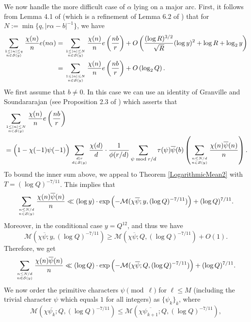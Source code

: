 \documentclass[12pt]{amsart}
\theoremstyle{definition}
\numberwithin{equation}{section}
\newcommand{\mc}{\mathcal}
\renewcommand{\bar}{\overline}
\begin{document}
We now handle the more difficult case of $\alpha$ lying on a major arc. First, it follows from Lemma 4.1 of \cite{GOLD} (which is a refinement of Lemma 6.2 of \cite{GrSo2}) that for $N := \min\{q,|r\alpha - b|^{-1}\}$, we have
\begin{equation}\label{DIVSUM}
\begin{aligned}
\sum_{1\leq |n| \leq q \atop n \in \mc{S}(y)} \frac{\chi(n)}{n}e(n\alpha) &= \sum_{1\leq |n| \leq N \atop n \in \mc{S}(y)} \frac{\chi(n)}{n}e\left(\frac{nb}{r}\right) + O\left(\frac{(\log R)^{3/2}}{\sqrt{R}}(\log y)^2 +\log R+\log_2 y\right)\\
&= \sum_{1\leq |n| \leq N \atop n \in \mc{S}(y)} \frac{\chi(n)}{n}e\left(\frac{nb}{r}\right) + O\left(\log_2 Q\right).
\end{aligned}
\end{equation}
We first assume that $b\neq 0$. In this case we can use an identity of Granville and Soundararajan (see Proposition 2.3 of \cite{GOLD}) which asserts that
\begin{equation}\label{GrSoIdentity}
\begin{aligned}
&\sum_{1\leq |n| \leq N \atop n \in \mc{S}(y)} \frac{\chi(n)}{n}e\left(\frac{nb}{r}\right)\\
&=\Big(1-\chi(-1)\psi(-1)\Big)\sum_{d\mid r \atop d \in \mc{S}(y)} \frac{\chi(d)}{d}\cdot \frac{1}{\phi(r/d)} \sum_{\psi \bmod r/d}\tau(\psi) \bar{\psi}(b) 
\left(\sum_{n \leq N/d \atop n \in \mc{S}(y)} \frac{\chi(n)\bar{\psi}(n)}{n}\right).
\end{aligned}
\end{equation}
To bound the inner sum above, we appeal to Theorem \ref{LogarithmicMean2} with $T=(\log Q)^{-7/11}$. This implies that
$$
\sum_{n \leq N/d \atop n \in \mc{S}(y)} \frac{\chi(n)\bar{\psi}(n)}{n}\ll (\log y)\cdot \exp\left(-\mc{M}(\chi\bar{\psi};y, (\log Q)^{-7/11})\right)+(\log Q)^{7/11}.
$$
Moreover, in the conditional case  $y = Q^{12}$, and thus we have
$$ \mc{M}(\chi\bar{\psi};y, (\log Q)^{-7/11})\geq \mc{M}(\chi\bar{\psi};Q, (\log Q)^{-7/11}) +O(1).$$
Therefore, we get
\begin{equation}\label{Thm1.3}
\sum_{n \leq N/d \atop n \in \mc{S}(y)} \frac{\chi(n)\bar{\psi}(n)}{n}\ll (\log Q)\cdot \exp\left(-\mc{M}(\chi\bar{\psi};Q, (\log Q)^{-7/11})\right)+(\log Q)^{7/11}.
\end{equation}
We now order the primitive characters $\psi\pmod \ell$ for $\ell\leq M$ (including the trivial character $\psi$ which equals $1$ for all integers)  as $\{\psi_k\}_k$, where
\begin{equation*}
\mc{M}(\chi\bar{\psi_k};Q, (\log Q)^{-7/11}) \leq \mc{M}(\chi\bar{\psi_{k+1}};Q, (\log Q)^{-7/11}), 
\end{equation*}
\end{document}
